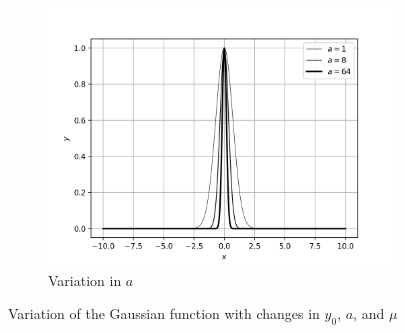 \documentclass[12]{article}
\begin{document}
\begin{figure}[H]
\begin{subfigure}[b!]{0.49\textwidth}
            \centering
            \includegraphics[width=\textwidth]{plots/q3p3.png}
            \caption{Variation in $a$}
            \label{fig:q3p3}
        \end{subfigure}
        \caption{Variation of the Gaussian function with changes in $y_0$, $a$, and $\mu$}
        \label{fig:q3p123}
    \end{figure}
\end{document}
